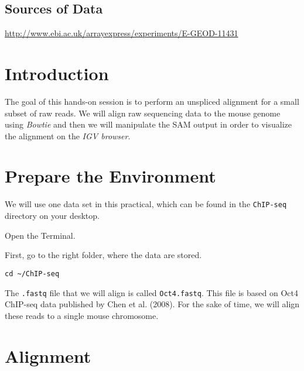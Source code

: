 \subsection{Sources of Data}
  \url{http://www.ebi.ac.uk/arrayexpress/experiments/E-GEOD-11431}

\clearpage

\section{Introduction}

\begin{information}
The goal of this hands-on session is to perform an unspliced alignment for a
small subset of raw reads. We will align raw sequencing data to the mouse genome
using \emph{Bowtie} and then we will manipulate the SAM output in order to
visualize the alignment on the \emph{IGV browser}.
\end{information}

\section{Prepare the Environment}

\begin{information}
We will use one data set in this practical, which can be found in the \texttt{ChIP-seq}
directory on your desktop.
\end{information}

\begin{steps}
Open the Terminal.

First, go to the right folder, where the data are stored.
\begin{lstlisting}
cd ~/ChIP-seq
\end{lstlisting}

\begin{information}
The \texttt{.fastq} file that we will align is called \texttt{Oct4.fastq}. This
file is based on Oct4 ChIP-seq data published by Chen et al. (2008). For the
sake of time, we will align these reads to a single mouse chromosome.
\end{information}
\end{steps}

\section{Alignment}

